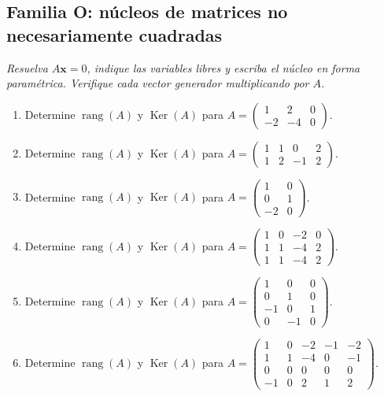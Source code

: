 \documentclass[12pt]{article}
\theoremstyle{remark}
\newcommand{\rang}{\operatorname{rang}}
\newcommand{\Ker}{\operatorname{Ker}}
\newcommand{\vect}[1]{\boldsymbol{#1}}
\newcounter{contadorEjercicio}
\newenvironment{listaejercicios}{\begin{enumerate}[label=\textbf{E\arabic*.},leftmargin=2.4em,itemsep=0.52em]\setcounter{enumi}{\value{contadorEjercicio}}}{\setcounter{contadorEjercicio}{\value{enumi}}\end{enumerate}}
\begin{document}
\subsection{Familia O: núcleos de matrices no necesariamente cuadradas}\noindent\textit{Resuelva $A\vect x=0$, indique las variables libres y escriba el núcleo en forma paramétrica. Verifique cada vector generador multiplicando por $A$.}\par\medskip
\begin{listaejercicios}

\item Determine $\rang(A)$ y $\Ker(A)$ para $A=\begin{pmatrix}1&2&0\\-2&-4&0\end{pmatrix}$.

\item Determine $\rang(A)$ y $\Ker(A)$ para $A=\begin{pmatrix}1&1&0&2\\1&2&-1&2\end{pmatrix}$.

\item Determine $\rang(A)$ y $\Ker(A)$ para $A=\begin{pmatrix}1&0\\0&1\\-2&0\end{pmatrix}$.

\item Determine $\rang(A)$ y $\Ker(A)$ para $A=\begin{pmatrix}1&0&-2&0\\1&1&-4&2\\1&1&-4&2\end{pmatrix}$.

\item Determine $\rang(A)$ y $\Ker(A)$ para $A=\begin{pmatrix}1&0&0\\0&1&0\\-1&0&1\\0&-1&0\end{pmatrix}$.

\item Determine $\rang(A)$ y $\Ker(A)$ para $A=\begin{pmatrix}1&0&-2&-1&-2\\1&1&-4&0&-1\\0&0&0&0&0\\-1&0&2&1&2\end{pmatrix}$.


\end{listaejercicios}
\end{document}
